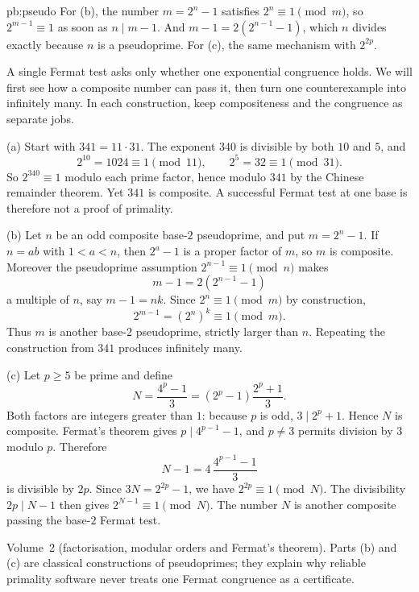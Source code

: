 \begin{solution}{pb:pseudo}
\idea For (b), the number $m=2^n-1$ satisfies $2^n\equiv1\pmod m$, so $2^{m-1}\equiv1$ as soon as $n\mid m-1$. And
$m-1=2(2^{n-1}-1)$, which $n$ divides exactly because $n$ is a pseudoprime. For (c), the same mechanism with $2^{2p}$.

\writeup
A single Fermat test asks only whether one exponential congruence holds. We will first see how a composite number can pass it, then turn one counterexample into infinitely many. In each construction, keep compositeness and the congruence as separate jobs.

 (a) Start with $341=11\cdot31$. The exponent $340$ is divisible by both $10$ and $5$, and
\[
2^{10}=1024\equiv1\pmod{11},\qquad
2^5=32\equiv1\pmod{31}.
\]
So $2^{340}\equiv1$ modulo each prime factor, hence modulo $341$ by the Chinese remainder theorem. Yet $341$ is composite. A successful Fermat test at one base is therefore not a proof of primality.

(b) Let $n$ be an odd composite base-$2$ pseudoprime, and put $m=2^n-1$. If $n=ab$ with $1<a<n$, then $2^a-1$ is a proper factor of $m$, so $m$ is composite. Moreover the pseudoprime assumption $2^{n-1}\equiv1\pmod n$ makes
\[
m-1=2(2^{n-1}-1)
\]
a multiple of $n$, say $m-1=nk$. Since $2^n\equiv1\pmod m$ by construction,
\[
2^{m-1}=(2^n)^k\equiv1\pmod m.
\]
Thus $m$ is another base-$2$ pseudoprime, strictly larger than $n$. Repeating the construction from $341$ produces infinitely many.

(c) Let $p\ge5$ be prime and define
\[
N=\frac{4^p-1}{3}
=(2^p-1)\frac{2^p+1}{3}.
\]
Both factors are integers greater than $1$: because $p$ is odd, $3\mid2^p+1$. Hence $N$ is composite. Fermat's theorem gives $p\mid4^{p-1}-1$, and $p\ne3$ permits division by $3$ modulo $p$. Therefore
\[
N-1=4\,\frac{4^{p-1}-1}{3}
\]
is divisible by $2p$. Since $3N=2^{2p}-1$, we have $2^{2p}\equiv1\pmod N$. The divisibility $2p\mid N-1$ then gives $2^{N-1}\equiv1\pmod N$. The number $N$ is another composite passing the base-$2$ Fermat test.

\tools Volume~2 (factorisation, modular orders and Fermat's theorem).
\leads Parts (b) and (c) are classical constructions of pseudoprimes; they explain why reliable primality software never treats one Fermat congruence as a certificate.
\end{solution}

